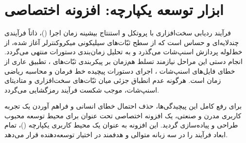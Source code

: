 \section[ابزار توسعه یکپارچه: افزونه اختصاصی \lr{CoreSight Trace Studio}]{ابزار توسعه یکپارچه: افزونه اختصاصی }
\label{sec:vscode_extension_studio}
فرآیند ردیابی سخت‌افزاری با پروتکل  و استنتاج بیشینه زمان اجرا ()، ذاتاً فرآیندی چندلایه‌ای و حساس است که از سطح ثبّات‌های سیلیکونی میکروکنترلر آغاز شده، از خط‌لوله پردازش اسنپ‌شات می‌گذرد و به تحلیل زمان‌بندی دستورات منتهی می‌گردد. انجام دستی این مراحل نیازمند تسلط هم‌زمان بر پیکربندی ثبّات‌های ، تطبیق عاری از خطای فایل‌های  اسنپ‌شات ، اجرای دستورات پیچیده خط فرمان و محاسبه ریاضی زمان است. هرگونه عدم انطباق جزئی میان ثبّات‌های سخت‌افزاری و متادیتای اسنپ‌شات، موجب شکست فرآیند رمزگشایی می‌گردد.

برای رفع کامل این پیچیدگی‌ها، حذف احتمال خطای انسانی و فراهم آوردن یک تجربه کاربری مدرن و صنعتی، یک افزونه اختصاصی تحت عنوان \textbf{} برای محیط توسعه محبوب  طراحی و پیاده‌سازی گردید. این افزونه به عنوان یک محیط کاربری یکپارچه ()، تمام ابعاد فرآیند را در سه زبانه متوالی و هدفمند در اختیار توسعه‌دهنده قرار می‌دهد.

